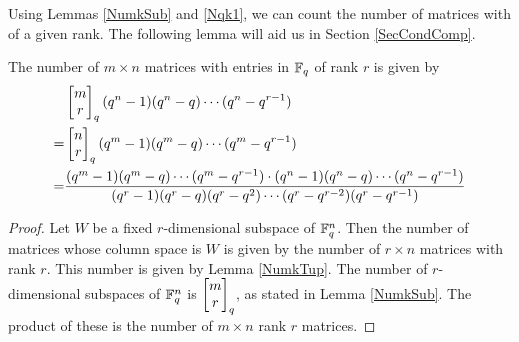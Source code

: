 Using Lemmas \ref{NumkSub} and \ref{Nqk1}, we can count the number of matrices with of a given rank. The following lemma will aid us in Section \ref{SecCondComp}.

\begin{lemma}\label{Num_mbyn_rankr}
The number of $m\times n$ matrices with entries in $\mathbb{F}_q$ of rank $r$ is given by
\begin{align*}
	&\begin{bmatrix}{m}\\ {r}\end{bmatrix}_q(q^n-1)(q^n-q)\cdots (q^n-q^{r-1})\\
   =& \begin{bmatrix}{n}\\ {r}\end{bmatrix}_q(q^m-1)(q^m-q)\cdots (q^m-q^{r-1})\\
   =& \frac{(q^m-1) (q^m-q) \cdots (q^m-q^{r-1})\cdot
            (q^n-1) (q^n-q) \cdots (q^n-q^{r-1})}
	 		      {(q^r-1)(q^r - q)(q^r - q^2)\cdots (q^r - q^{r-2})(q^r-q^{r-1})}
\end{align*}
\end{lemma}

\begin{proof}
  Let $W$ be a fixed $r$-dimensional subspace of $\mathbb{F}_q^{n}$.  Then the number of matrices whose column space is $W$ is given by the number of $r\times n$ matrices with rank $r$.  This number is given by Lemma \ref{NumkTup}. The number of $r$-dimensional subspaces of $\mathbb{F}_q^{n}$ is $\begin{bmatrix}{m}\\ {r}\end{bmatrix}_q$, as stated in Lemma \ref{NumkSub}.  The product of these is the number of $m\times n$ rank $r$ matrices.
\end{proof}

